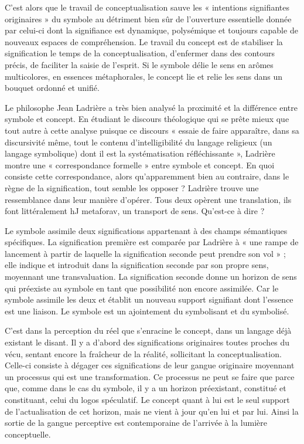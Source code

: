 C’est alors que le travail de conceptualisation sauve les « intentions signifiantes originaires » du symbole au détriment bien sûr de l’ouverture essentielle donnée par celui-ci dont la signifiance est dynamique, polysémique et toujours capable de nouveaux espaces de compréhension. Le travail du concept est de stabiliser la signification le temps de la conceptualisation, d’enfermer dans des contours précis, de faciliter la saisie de l’esprit. Si le symbole délie le sens en arômes multicolores, en essences métaphorales, le concept lie et relie les sens dans un bouquet ordonné et unifié.

Le philosophe Jean Ladrière a très bien analysé la proximité et la différence entre symbole et concept. En étudiant le discours théologique qui se prête mieux que tout autre à cette analyse puisque ce discours « essaie de faire apparaître, dans sa discursivité même, tout le contenu d’intelligibilité du langage religieux (un langage symbolique) dont il est la systématisation réfléchissante », Ladrière montre une « correspondance formelle » entre symbole et concept. En quoi consiste cette correspondance, alors qu’apparemment bien au contraire, dans le règne de la signification, tout semble les opposer ? Ladrière trouve une ressemblance dans leur manière d’opérer. Tous deux opèrent une translation, ils font littéralement hJ metaforav, un transport de sens. Qu’est-ce à dire ?

Le symbole assimile deux significations appartenant à des champs sémantiques spécifiques. La signification première est comparée par Ladrière à « une rampe de lancement à partir de laquelle la signification seconde peut prendre son vol » ; elle indique et introduit dans la signification seconde par son propre sens, moyennant une transvaluation. La signification seconde donne un horizon de sens qui préexiste au symbole en tant que possibilité non encore assimilée. Car le symbole assimile les deux et établit un nouveau support signifiant dont l’essence est une liaison. Le symbole est un ajointement du symbolisant et du symbolisé.

C’est dans la perception du réel que s’enracine le concept, dans un langage déjà existant le disant. Il y a d’abord des significations originaires toutes proches du vécu, sentant encore la fraîcheur de la réalité, sollicitant la conceptualisation. Celle-ci consiste à dégager ces significations de leur gangue originaire moyennant un processus qui est une transformation. Ce processus ne peut se faire que parce que, comme dans le cas du symbole, il y a un horizon préexistant, constitué et constituant, celui du logos spéculatif. Le concept quant à lui est le seul support de l’actualisation de cet horizon, mais ne vient à jour qu’en lui et par lui. Ainsi la sortie de la gangue perceptive est contemporaine de l’arrivée à la lumière conceptuelle.

